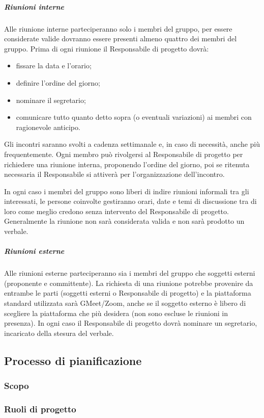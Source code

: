 \subparagraph{Riunioni interne}
Alle riunione interne parteciperanno solo i membri del gruppo, per essere considerate valide dovranno essere presenti almeno quattro dei membri del gruppo. Prima di ogni riunione il Responsabile di progetto dovrà:
\begin{itemize}
\item fissare la data e l'orario;
\item definire l'ordine del giorno;
\item nominare il segretario;
\item comunicare tutto quanto detto sopra (o eventuali variazioni) ai membri con ragionevole anticipo.
\end{itemize}

Gli incontri saranno svolti a cadenza settimanale e, in caso di necessità, anche più frequentemente.
Ogni membro può rivolgersi al Responsabile di progetto per richiedere una riunione interna, proponendo l'ordine del giorno, poi se ritenuta necessaria il Responsabile si attiverà per l'organizzazione dell'incontro.

In ogni caso i membri del gruppo sono liberi di indire riunioni informali tra gli interessati, le persone coinvolte gestiranno orari, date e temi di discussione tra di loro come meglio credono senza intervento del Responsabile di progetto.
Generalmente la riunione non sarà considerata valida e non sarà prodotto un verbale.

\subparagraph{Riunioni esterne}
Alle riunioni esterne parteciperanno sia i membri del gruppo che soggetti esterni (proponente e committente). La richiesta di una riunione potrebbe provenire da entrambe le parti (soggetti esterni o Responsabile di progetto) e la piattaforma standard utilizzata sarà GMeet/Zoom, anche se il soggetto esterno è libero di scegliere la piattaforma che più desidera (non sono escluse le riunioni in presenza). In ogni caso il Responsabile di progetto dovrà nominare un segretario, incaricato della stesura del verbale.

\subsection{Processo di pianificazione}
\subsubsection{Scopo}
\subsubsection{Ruoli di progetto}
